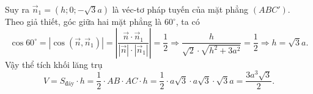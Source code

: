 \begin{ex}
{$$		 $$
		Suy ra $\overrightarrow{n}_1 = \left(h; 0; -\sqrt{3}a\right)$ là  véc-tơ pháp tuyến của mặt phẳng $(ABC')$.\\
		Theo giả thiết, góc giữa  hai mặt phẳng là $60^\circ$, ta có
		$$ 
		\cos 60^\circ = \left|\cos(\overrightarrow{n}, \overrightarrow{n}_1)\right| = \left|\dfrac{\overrightarrow{n} \cdot  \overrightarrow{n}_1}{\left|\overrightarrow{n}\right|\cdot \left|\overrightarrow{n}_1\right|}\right| = \dfrac{1}{2}
		\Rightarrow \dfrac{h}{\sqrt{2} \cdot \sqrt{h^2 + 3a^2}} = \dfrac{1}{2} \Rightarrow h =  \sqrt{3}a.
		$$ 
		Vậy  thể tích khối lăng trụ
		 $$
		V = S_{\text{đáy}} \cdot h = \dfrac{1}{2} \cdot AB \cdot AC \cdot h  = \dfrac{1}{2} \cdot a\sqrt{3} \cdot a\sqrt{3} \cdot \sqrt{3}a = \dfrac{3a^3\sqrt{3}}{2}.
		$$ 
	 }
\end{ex}

